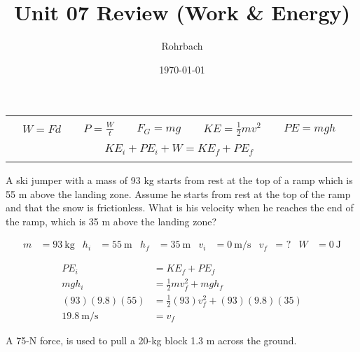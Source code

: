 \documentclass[10pt]{exam}
\title{Unit 07 Review (Work \& Energy)}
\author{Rohrbach}
\date{\today}
\newcommand{\printeqs}{
  \ifprintanswers
  \else
    \begin{center}
      \begin{tabular}{|*{11}{c}|}
        \hline 
        &&&&&&&&&&\\
        &
        $W=Fd$ &&
        $P=\frac{W}{t}$ &&
        $F_G=mg$ &&
        $KE=\frac{1}{2}mv^2$ &&
        $PE=mgh$ &\\
        &&&&&&&&&&\\
        \multicolumn{11}{|c|}{$KE_i + PE_i + W = KE_f + PE_f$}\\
        &&&&&&&&&&\\
        \hline
      \end{tabular}
    \end{center}
  \fi
}
\begin{document}
\maketitle

\printeqs

\begin{questions}

\question
  A ski jumper with a mass of 93 kg starts from rest at the top of a ramp which is 55 m above the landing zone.  Assume he starts from rest at the top of the ramp and that the snow is frictionless.  What is his velocity when he reaches the end of the ramp, which is 35 m above the landing zone?

  \ifprintanswers
  \else
  \fi

  \begin{solution}[\stretch{1}]
    \begin{align*}
      m   &= \SI{93}{\kilo\gram} &
      h_i &= \SI{55}{\meter}     &
      h_f &= \SI{35}{\meter}     &
      v_i &= \SI{0}{\meter\per\second} &
      v_f &= \text { ?}          &
      W   &= \SI{0}{\joule}
    \end{align*}

    \begin{align*}
      PE_i  &= KE_f + PE_f \\
      mgh_i &= \frac{1}{2}mv_f^2 + mgh_f \\
      (93)(9.8)(55) &= \frac{1}{2}(93)v_f^2+(93)(9.8)(35) \\
      \SI{19.8}{\meter\per\second} &= v_f
    \end{align*}
  \end{solution}

\question
  A 75-N force, is used to pull a 20-kg block 1.3 m across the ground.

\end{questions}
\end{document}
